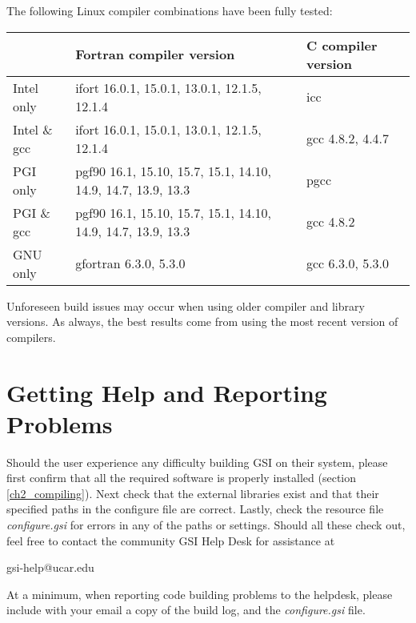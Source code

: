 The following Linux compiler combinations have been fully tested:
\begin{table}[htbp]
\centering
\begin{tabular}{| l | l | l |}
\hline
  & Fortran compiler version   &   C compiler version    \\
\hline
\hline
Intel only  &  ifort    16.0.1, 15.0.1, 13.0.1, 12.1.5, 12.1.4       & icc \\
\hline
Intel \& gcc  &  ifort    16.0.1, 15.0.1, 13.0.1, 12.1.5, 12.1.4       &  gcc 4.8.2, 4.4.7  \\
\hline
PGI only  &   pgf90   16.1, 15.10, 15.7, 15.1, 14.10, 14.9, 14.7, 13.9, 13.3    &  pgcc  \\
\hline
PGI \& gcc  &   pgf90   16.1, 15.10, 15.7, 15.1, 14.10, 14.9, 14.7, 13.9, 13.3    &    gcc 4.8.2 \\
\hline
GNU only &  gfortran  6.3.0, 5.3.0   & gcc 6.3.0, 5.3.0 \\
\hline
\end{tabular}
\label{ch2_tble3}
\end{table} 

Unforeseen build issues may occur when using older compiler and library versions. As always, the best results come from using the most recent version of compilers.

\section{Getting Help and Reporting Problems}  \label{ch2_gettinghelp}

Should the user experience any difficulty building GSI on their system, please first confirm that 
all the required software is properly installed (section \ref{ch2_compiling}). Next check that the 
external libraries exist and that their specified paths in the configure file are correct. Lastly, 
check the resource file \textit{configure.gsi} for errors in any of the paths or settings. Should 
all these check out, feel free to contact the community GSI Help Desk for assistance at 
\begin{center}
{gsi-help@ucar.edu}
\end{center}

At a minimum, when reporting code building problems to the helpdesk, please include with your 
email a copy of the build log, and the \textit{configure.gsi} file.


